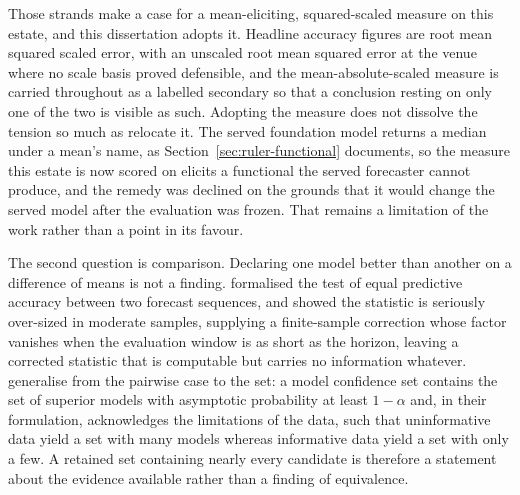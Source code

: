 Those strands make a case for a mean-eliciting, squared-scaled measure on this
estate, and this dissertation adopts it. Headline accuracy figures are root mean
squared scaled error, with an unscaled root mean squared error at the venue
where no scale basis proved defensible, and the mean-absolute-scaled measure is
carried throughout as a labelled secondary so that a conclusion resting on only
one of the two is visible as such. Adopting the measure does not dissolve the
tension so much as relocate it. The served foundation model returns a median
under a mean's name, as Section~\ref{sec:ruler-functional} documents, so the
measure this estate is now scored on elicits a functional the served forecaster
cannot produce, and the remedy was declined on the grounds that it would change
the served model after the evaluation was frozen. That remains a limitation of
the work rather than a point in its favour.

The second question is comparison. Declaring one model better than another on a
difference of means is not a finding.
\citet{diebold_comparing_1995} formalised the test of equal predictive accuracy
between two forecast sequences, and \citet{harvey_testing_1997} showed the
statistic is seriously over-sized in moderate samples, supplying a finite-sample
correction whose factor vanishes when the evaluation window is as short as the
horizon, leaving a corrected statistic that is computable but carries no
information whatever. \citet{hansen_model_2011} generalise from the pairwise case
to the set: a model confidence set contains the set of superior models with
asymptotic probability at least $1 - \alpha$ and, in their formulation,
acknowledges the limitations of the data, such that uninformative data yield a
set with many models whereas informative data yield a set with only a few. A
retained set containing nearly every candidate is therefore a statement about the
evidence available rather than a finding of equivalence.


